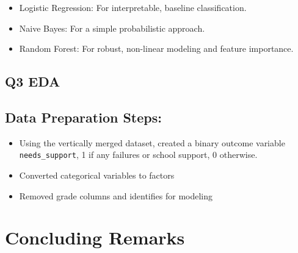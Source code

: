 \documentclass[12pt]{article}
\begin{document}
\begin{itemize}
    \item Logistic Regression: For interpretable, baseline classification.
    \item Naive Bayes: For a simple probabilistic approach.
    \item Random Forest: For robust, non-linear modeling and feature importance.
\end{itemize}


\subsection{Q3 EDA}

\subsection{Data Preparation Steps:}
\begin{itemize}
    \item Using the vertically merged dataset, created a binary outcome variable \texttt{needs_support}, 1 if any failures or school support, 0 otherwise.
    \item Converted categorical variables to factors
    \item Removed grade columns and identifies for modeling
\end{itemize}


\section{Concluding Remarks}
\end{document}
